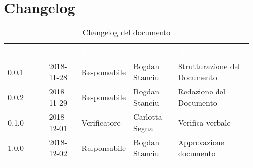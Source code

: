 \newpage

\section{Changelog}

\begin{center}
\begin{longtable}[c]{|m{}|m{}|m{}|m{}|p{}|}
\hline
\rowcolor{bluelogo}\textbf{\textcolor{white}{Versione}} & \textbf{\textcolor{white}{Data}} & \textbf{\textcolor{white}{Ruolo}} & \textbf{\textcolor{white}{Autore}} & \textbf{\textcolor{white}{Descrizione}}\\
\hline \hline
\endfirsthead
0.0.1 & 2018-11-28  & Responsabile & Bogdan Stanciu& Strutturazione del Documento \\
\hline
\rowcolor{grigio}0.0.2 & 2018-11-29 & Responsabile & Bogdan Stanciu & Redazione del Documento \\
\hline
0.1.0 & 2018-12-01  & Verificatore & Carlotta Segna & Verifica verbale \\
\hline
\rowcolor{grigio}1.0.0 & 2018-12-02 & Responsabile & Bogdan Stanciu & Approvazione documento\\
\hline
\caption{Changelog del documento}
\end{longtable}
\end{center}
